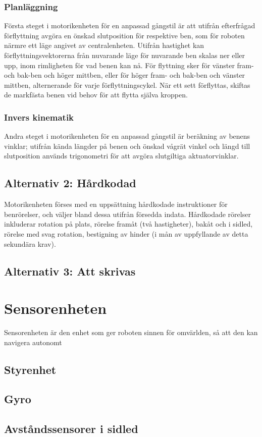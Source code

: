 \documentclass[a4paper,titlepage,12pt]{article}
\begin{document}
    	\subsubsection{Planläggning}
    Första steget i motorikenheten för en anpassad gångstil är att utifrån efterfrågad
    förflyttning avgöra en önskad slutposition för respektive ben, som för roboten närmre 
    ett läge angivet av centralenheten. Utifrån hastighet kan förflyttningsvektorerna 
    från nuvarande läge för nuvarande ben skalas ner eller upp, inom rimligheten för vad
    benen kan nå. För flyttning sker för vänster fram- och bak-ben och höger 
    mittben, eller för höger fram- och bak-ben och vänster mittben, alternerande för varje
    förflyttningscykel. När ett sett förflyttas, skiftas de markfästa benen vid behov för 
    att flytta själva kroppen. 
    
    	\subsubsection{Invers kinematik}
    Andra steget i motorikenheten för en anpassad gångstil är beräkning av benens vinklar;
    utifrån kända längder på benen  och önskad vågrät vinkel och längd till slutposition 
    används trigonometri för att avgöra slutgiltiga aktuatorvinklar.
    
    	\subsection{Alternativ 2: Hårdkodad}
    Motorikenheten förses med en uppsättning hårdkodade instruktioner för benrörelser, och
    väljer bland dessa utifrån försedda indata. Hårdkodade rörelser inkluderar rotation på 
    plats, rörelse framåt (två hastigheter), bakåt och i sidled, rörelse med svag rotation, 
    bestigning av hinder (i mån av uppfyllande av detta sekundära krav). 
    
    	\subsection{Alternativ 3: Att skrivas}
    
	\section{Sensorenheten}
    
    Sensorenheten är den enhet som ger roboten sinnen för omvärlden, så att den
    kan navigera autonomt 

    \subsection{Styrenhet}

    \subsection{Gyro}
    
    \subsection{Avståndssensorer i sidled}
\end{document}
